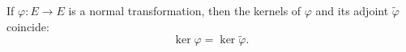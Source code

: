 If $\varphi: E \rightarrow E$ is a normal transformation, then the kernels of $\varphi$ and its adjoint $\tilde{\varphi}$ coincide:
$$\ker \varphi = \ker \tilde{\varphi}.$$
